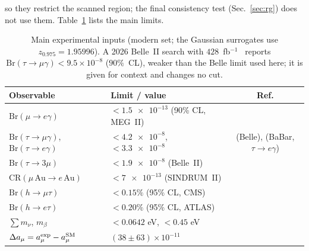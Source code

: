 \documentclass[twocolumn,epjc3]{svjour3}
\newcommand{\Br}{\mathrm{Br}}
\begin{document}
so they restrict the scanned region; the final consistency test (Sec.~\ref{sec:rg}) does not use them. Table~\ref{tab:inputs} lists the main limits.

\begin{table}[t]\centering\small
\begin{tabular}{llc}\toprule
Observable & Limit / value & Ref.\\\midrule
$\Br(\mu\to e\gamma)$ & $<\num{1.5e-13}$ (90\% CL, MEG~II) & \cite{MEGII:2025gzr}\\
$\Br(\tau\to\mu\gamma)$, $\Br(\tau\to e\gamma)$ & $<\num{4.2e-8}$, $<\num{3.3e-8}$ & \cite{Uno:2021lal} (Belle), \cite{BaBar:2009hkt} (BaBar, $\tau\to e\gamma$)\\
$\Br(\tau\to3\mu)$ & $<\num{1.9e-8}$ (Belle~II) & \cite{BelleII:2024tau3mu}\\
$\mathrm{CR}(\mu\,\mathrm{Au}\to e\,\mathrm{Au})$ & $<\num{7e-13}$ (SINDRUM~II) & \cite{HerreroGarcia:2017xdq}\\
$\Br(h\to\mu\tau)$ & $<0.15\%$ (95\% CL, CMS) & \cite{CMS:2021rsq}\\
$\Br(h\to e\tau)$ & $<0.20\%$ (95\% CL, ATLAS) & \cite{ATLAS:2023mvd}\\
$\sum m_\nu$, $m_\beta$ & $<0.0642$ eV, $<0.45$ eV & \cite{Elbers:2025vlz,KATRIN:2024cdt}\\
$\Delta a_\mu=a_\mu^{\rm exp}-a_\mu^{\rm SM}$ & $(38\pm63)\times10^{-11}$ & \cite{Aliberti:2025beg}\\\bottomrule
\end{tabular}\caption{Main experimental inputs (modern set; the Gaussian surrogates use $z_{0.975}=1.95996$). A 2026 Belle~II search with $428$~fb$^{-1}$~\cite{BelleII:2026tmg} reports $\Br(\tau\to\mu\gamma)<9.5\times10^{-8}$ ($90\%$~CL), weaker than the Belle limit used here; it is given for context and changes no cut.}\label{tab:inputs}\end{table}
\end{document}
